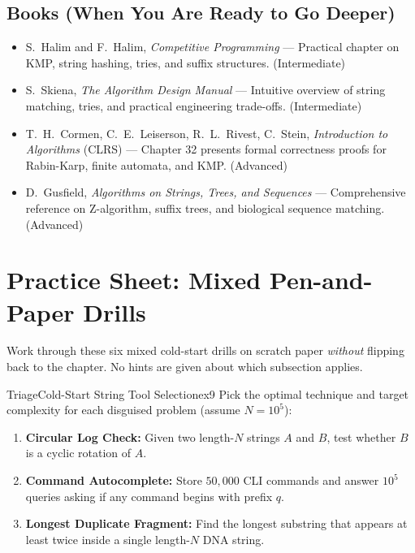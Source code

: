\documentclass[11pt,a4paper]{article}
\theoremstyle{definition}
\begin{document}
\subsection*{Books (When You Are Ready to Go Deeper)}
\begin{itemize}
    \item S.\ Halim and F.\ Halim, \emph{Competitive Programming} --- Practical chapter on KMP, string hashing, tries, and suffix structures. (Intermediate)
    \item S.\ Skiena, \emph{The Algorithm Design Manual} --- Intuitive overview of string matching, tries, and practical engineering trade-offs. (Intermediate)
    \item T.\ H.\ Cormen, C.\ E.\ Leiserson, R.\ L.\ Rivest, C.\ Stein, \emph{Introduction to Algorithms} (CLRS) --- Chapter 32 presents formal correctness proofs for Rabin-Karp, finite automata, and KMP. (Advanced)
    \item D.\ Gusfield, \emph{Algorithms on Strings, Trees, and Sequences} --- Comprehensive reference on Z-algorithm, suffix trees, and biological sequence matching. (Advanced)
\end{itemize}

\section*{Practice Sheet: Mixed Pen-and-Paper Drills}

\noindent
Work through these six mixed cold-start drills on scratch paper \emph{without} flipping back to the chapter. No hints are given about which subsection applies.

\begin{tryitbox}{Triage}{Cold-Start String Tool Selection}{ex9}
Pick the optimal technique and target complexity for each disguised problem (assume $N = 10^5$):
\begin{enumerate}
    \item \textbf{Circular Log Check:} Given two length-$N$ strings $A$ and $B$, test whether $B$ is a cyclic rotation of $A$.
    \item \textbf{Command Autocomplete:} Store $50{,}000$ CLI commands and answer $10^5$ queries asking if any command begins with prefix $q$.
    \item \textbf{Longest Duplicate Fragment:} Find the longest substring that appears at least twice inside a single length-$N$ DNA string.
\end{enumerate}
\end{tryitbox}
\end{document}
